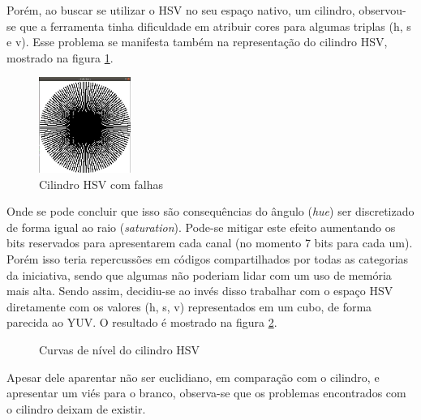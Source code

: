 \documentclass{article}[twocolumn]
\begin{document}
	Por\'em, ao buscar se utilizar o HSV no seu espa\c{c}o nativo, um cilindro, observou-se
	que a ferramenta tinha dificuldade em atribuir cores para algumas triplas (h, s e v). Esse
	problema se manifesta tamb\'em na representa\c{c}\~ao do cilindro HSV, mostrado na figura
	\ref{fig:hsv_buggy}.
	\begin{figure}[H]
		\centering
		\includegraphics[width=3cm]{hsvcyl_low_buggy.png}
		\caption{Cilindro HSV com falhas}
		\label{fig:hsv_buggy}
	\end{figure}
	Onde se pode concluir que isso s\~ao consequ\^encias do \^angulo (\textit{hue}) ser discretizado
	de forma igual ao raio (\textit{saturation}). Pode-se mitigar este efeito aumentando os bits
	reservados para apresentarem cada canal (no momento 7 bits para cada um). Por\'em isso teria
	repercuss\~oes em c\'odigos compartilhados por todas as categorias da iniciativa, sendo que
	algumas n\~ao poderiam lidar com um uso de mem\'oria mais alta. Sendo assim, decidiu-se ao
	inv\'es disso trabalhar com o espa\c{c}o HSV diretamente com os valores (h, s, v) representados
	em um cubo, de forma parecida ao YUV. O resultado \'e mostrado na figura \ref{fig:cyl_hsv}.
	\begin{figure}[H]
		\centering
		\caption{Curvas de n\'ivel do cilindro HSV}
		\label{fig:cyl_hsv}
	\end{figure}
	Apesar dele aparentar n\~ao ser euclidiano, em compara\c{c}\~ao com o cilindro, e apresentar
	um vi\'es para o branco, observa-se que os problemas encontrados com o cilindro deixam
	de existir.
\end{document}
